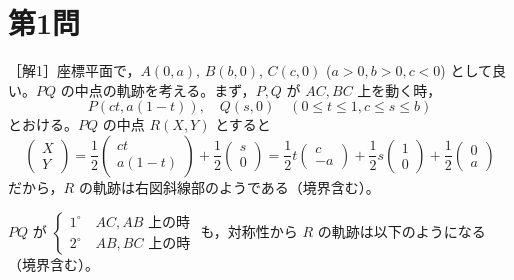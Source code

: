 \documentclass[../main.tex]{subfiles}
\begin{document}
\section*{第1問}

［解1］座標平面で，$A(0, a)$, $B(b, 0)$, $C(c, 0)$ ($a>0, b>0, c<0$) として良い。$PQ$ の中点の軌跡を考える。まず，$P, Q$ が $AC, BC$ 上を動く時，
\[
  P(ct, a(1-t)), \quad Q(s, 0) \quad (0 \le t \le 1, c \le s \le b)
\]
とおける。$PQ$ の中点 $R(X, Y)$ とすると
\[
  \begin{pmatrix} X \\ Y
  \end{pmatrix} = \frac{1}{2}
  \begin{pmatrix} ct \\ a(1-t)
  \end{pmatrix} + \frac{1}{2}
  \begin{pmatrix} s \\ 0
  \end{pmatrix} = \frac{1}{2} t
  \begin{pmatrix} c \\ -a
  \end{pmatrix} + \frac{1}{2} s
  \begin{pmatrix} 1 \\ 0
  \end{pmatrix} + \frac{1}{2}
  \begin{pmatrix} 0 \\ a
  \end{pmatrix}
\]
だから，$R$ の軌跡は右図斜線部のようである（境界含む）。

\begin{center}
\end{center}

$PQ$ が
$
\begin{cases} 1^\circ \quad AC, AB \text{ 上の時} \\ 2^\circ \quad AB, BC \text{ 上の時}
\end{cases}$
も，対称性から $R$ の軌跡は以下のようになる（境界含む）。
\end{document}
